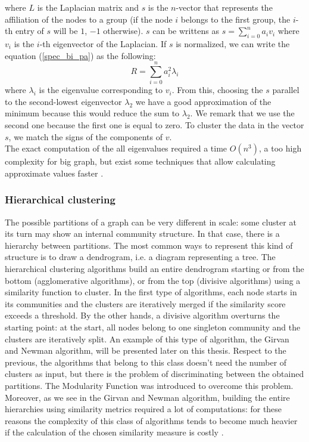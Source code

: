 where $L$ is the Laplacian matrix and $s$ is the $n$-vector that represents the affiliation of the nodes to a group (if the node $i$ belongs to the first group, the $i$-th entry of $s$ will be $1$, $-1$ otherwise).
$s$ can be writtens as $s= \sum_{i=0}^n a_i v_i$ where $v_i$ is the $i$-th eigenvector of the Laplacian.
If $s$ is normalized, we can write the equation (\ref{spec_bi_pa}) as the following:
\begin{equation}\label{spec_bi_pa}
R = \sum_{i=0}^n a_i^2 \lambda_i
\end{equation} 
where $\lambda_i$ is the eigenvalue corresponding to $v_i$.
From this, choosing the $s$ parallel to the second-lowest eigenvector $\lambda_2$ we have a good approximation of the minimum because this would reduce the sum to $\lambda_2$. We remark that we use the second one because the first one is equal to zero. To cluster the data in the vector $s$, we match the signs of the components of $v$. \\
The exact computation of the all eigenvalues required a time $O(n^3)$, a too high complexity for big graph, but exist some techniques that allow calculating approximate values faster \cite{fortunato}.
 
\subsubsection{Hierarchical clustering}
The possible partitions of a graph can be very different in scale: some cluster at its turn may show an internal community structure. In that case, there is a hierarchy between partitions. The most common ways to represent this kind of structure is to draw a dendrogram, i.e. a diagram representing a tree. The hierarchical clustering algorithms build an entire dendrogram starting or from the bottom (agglomerative algorithms), or from the top (divisive algorithms) using a similarity function to cluster. In the first type of algorithms, each node starts in its communities and the clusters are iteratively merged if the similarity score exceeds a threshold. By the other hands, a divisive algorithm overturns the starting point: at the start, all nodes belong to one singleton community and the clusters are iteratively split. An example of this type of algorithm, the Girvan and Newman algorithm, will be presented later on this thesis.  
Respect to the previous, the algorithms that belong to this class doesn't need the number 
of clusters as input, but there is the problem of discriminating between the obtained partitions.  The Modularity Function was introduced to overcome this problem. Moreover, as we see in the Girvan and Newman algorithm, building the entire hierarchies using similarity metrics required a lot of computations: for these reasons the complexity of this class of algorithms tends to become much heavier if the calculation of the chosen similarity measure is costly \cite{fortunato}.


